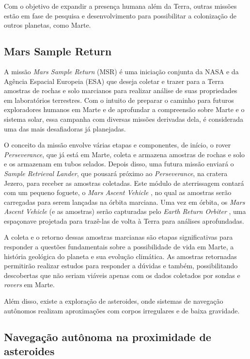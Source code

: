 Com o objetivo de expandir a presença humana além da Terra, outras missões estão em fase de pesquisa e desenvolvimento para possibilitar a colonização de outros planetas, como Marte.

\subsection{Mars Sample Return}

A missão \textit{Mars Sample Return} (MSR) \cite{nasa_mars_sample_return_2025} é uma iniciação conjunta da NASA e da Agência Espacial Europeia (ESA) que deseja coletar e trazer para a Terra amostras de rochas e solo marcianos para realizar análise de suas propriedades em laboratórios terrestres. Com o intuito de preparar o caminho para futuros exploradores humanos em Marte e de aprofundar a compreensão sobre Marte e o sistema solar, essa campanha com diversas missões derivadas dela, é considerada uma das mais desafiadoras já planejadas.

O conceito da missão envolve várias etapas e componentes, de início, o rover \textit{Perseverance}, que já está em Marte, coleta e armazena amostras de rochas e solo e os armazenam em tubos selados. Depois disso, uma futura missão enviará o \textit{Sample Retrieval Lander}, que pousará próximo ao \textit{Perseverance}, na cratera Jezero, para receber as amostras coletadas. Este módulo de aterrissagem contará com um pequeno foguete, o \textit{Mars Ascent Vehicle} \cite{nasa_mars_ascent_vehicle_2025}, no qual as amostras serão carregadas para serem lançadas na órbita marciana. Uma vez em órbita, os \textit{Mars Ascent Vehicle} (e as amostras) serão capturadas pelo \textit{Earth Return Orbiter} \cite{nasa_earth_return_orbiter_2025}, uma espaçonave projetada para trazê-las de volta à Terra para análises aprofundadas.

A coleta e o retorno dessas amostras marcianas são etapas significativas para responder a questões fundamentais sobre a possibilidade de vida em Marte, a história geológica do planeta e sua evolução climática. As amostras retornadas permitirão realizar estudos para responder a dúvidas e também, possibilitando descobertas que não seriam viáveis apenas com os dados coletados por sondas e \textit{rovers} em Marte.

Além disso, existe a exploração de asteroides, onde sistemas de navegação autônomos realizam aproximações com corpos irregulares e de baixa gravidade.

\subsection{Navegação autônoma na proximidade de asteroides}

